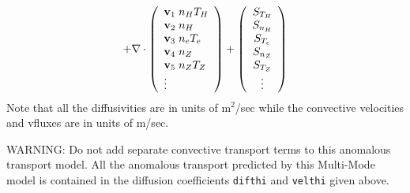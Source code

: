 $$
 + \nabla \cdot
\left( \begin{array}{l} {\bf v}_1 \; n_H T_H \\ {\bf v}_2 \; n_H \\
   {\bf v}_3 \; n_e T_e \\
   {\bf v}_4 \; n_Z \\ {\bf v}_5 \; n_Z T_Z \\
    \vdots \end{array} \right) +
 \left( \begin{array}{c} S_{T_H} \\ S_{n_H} \\ S_{T_e} \\
    S_{n_Z} \\ S_{T_Z} \\ \vdots
    \end{array} \right) $$
Note that all the diffusivities are in units of m$^2$/sec while the
convective velocities and vfluxes are in units of m/sec.

WARNING:  Do not add separate convective transport terms to this
anomalous transport model.  All the anomalous transport 
predicted by this Multi-Mode model is contained
in the diffusion coefficients {\tt difthi} and {\tt velthi} given
above.

